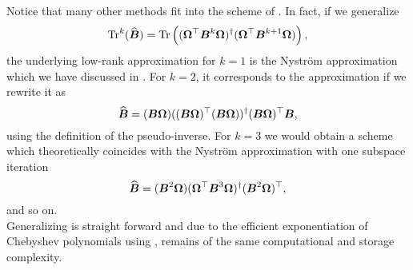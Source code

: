 Notice that many other methods \cite{halko2011finding,tropp2023randomized} fit
into the scheme of . In fact, if we
generalize
\begin{equation}
    \operatorname{Tr}^{k}(\widehat{\boldsymbol{B}})
        = \operatorname{Tr}\left((\boldsymbol{\Omega}^{\top} \boldsymbol{B}^k \boldsymbol{\Omega})^{\dagger} (\boldsymbol{\Omega}^{\top} \boldsymbol{B}^{k+1} \boldsymbol{\Omega}) \right),
    \label{equ:3-nystrom-trace-generalization}
\end{equation}
the underlying low-rank approximation for $k=1$ is the Nystr\"om approximation
which we have discussed in .
For $k=2$, it corresponds to the approximation 
if we rewrite it as
\begin{equation}
    \widehat{\boldsymbol{B}} = (\boldsymbol{B} \boldsymbol{\Omega}) ((\boldsymbol{B} \boldsymbol{\Omega})^{\top} (\boldsymbol{B} \boldsymbol{\Omega}))^{\dagger} (\boldsymbol{B} \boldsymbol{\Omega})^{\top} \boldsymbol{B},
    \label{equ:3-nystrom-RSVD-rewritten}
\end{equation}
using the definition of the pseudo-inverse.
For $k=3$ we would obtain a scheme which theoretically coincides with the Nystr\"om
approximation with one subspace iteration \cite{tropp2023randomized}
\begin{equation}
    \widehat{\boldsymbol{B}} = (\boldsymbol{B}^2 \boldsymbol{\Omega}) (\boldsymbol{\Omega}^{\top} \boldsymbol{B}^3 \boldsymbol{\Omega})^{\dagger} (\boldsymbol{B}^2 \boldsymbol{\Omega})^{\top},
    \label{equ:3-nystrom-nystrom-SI}
\end{equation}
and so on.\\

Generalizing  is straight forward and
due to the efficient exponentiation of Chebyshev polynomials using
, remains of the same
computational and storage complexity.


